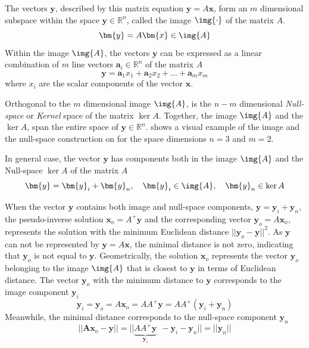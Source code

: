 The vectors $\bm{y}$, described by this matrix equation $\bm{y} = A\bm{x}$, form an $m$ dimensional subspace within the space $\bm{y}\in\mathbb{R}^n$, called the image $\img{\cdot}$ of the matrix $A$. 
\begin{equation}
    \bm{y}=A\bm{x} \in \img{A}
\end{equation}
Within the image $\img{A}$, the vectors $\bm{y}$ can be expressed as a linear combination of $m$ line vectors $\bm{a}_i\in\mathbb{R}^n$ of the matrix $A$ \cite{LARSON2013}
\begin{equation}
    \bm{y} = \bm{a}_1x_1 +  \bm{a}_2x_2 + \ldots +  \bm{a}_mx_m
\end{equation}
where $x_i$ are the scalar components of the vector $\bm{x}$.


Orthogonal to the $m$ dimensional image $\img{A}$, is the $n-m$ dimensional \textit{Null-space} or \textit{Kernel} space of the matrix $\ker{A}$. Together, the image $\img{A}$ and the $\ker{A}$, span the entire space of $\bm{y}\in\mathbb{R}^n$.
 shows a visual example of the image and the null-space construction on for the space dimensions $n=3$ and $m=2$.

In general case, the vector $\bm{y}$ has components both in the image $\img{A}$ and the Null-space $\ker{A}$ of the matrix $A$
\begin{equation}
    \bm{y} = \bm{y}_i + \bm{y}_n, \quad \bm{y}_i\in\img{A}, \quad  \bm{y}_n\in\ker{A}
\end{equation}

When the vector $\bm{y}$ contains both image and null-space components, $\bm{y} = \bm{y}_i + \bm{y}_n$, the pseudo-inverse solution $\bm{x}_o = A^+\bm{y}$ and the corresponding vector $\bm{y}_o = A\bm{x}_o$, represents the solution with the minimum Euclidean distance $||\bm{y}_o - \bm{y}||^2$. As $\bm{y}$ can not be represented by $\bm{y}=A\bm{x}$, the minimal distance is not zero, indicating that $\bm{y}_o$ is not equal to $\bm{y}$. Geometrically, the solution $\bm{x}_o$ represents the vector $\bm{y}_o$ belonging to the image $\img{A}$ that is closest to $\bm{y}$ in terms of Euclidean distance. The vector $\bm{y}_o$ with the minimum distance to $\bm{y}$ corresponds to the image component $\bm{y}_i$
\begin{equation}
\bm{y}_i = \bm{y}_o= A\bm{x}_o = AA^+\bm{y}=AA^+(\bm{y}_i + \bm{y}_n)
\end{equation}
Meanwhile, the minimal distance corresponds to the null-space component $\bm{y}_n$
\begin{equation}
||\bm{A}\bm{x}_o - \bm{y}|| = ||\underbrace{AA^+\bm{y}}_{\bm{y}_i} ~~ - \bm{y}_i - \bm{y}_n ||= ||\bm{y}_n ||
\end{equation}

